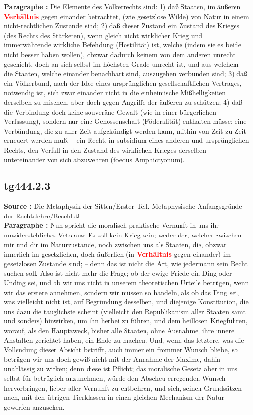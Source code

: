 \documentclass[a4paper,12pt,twoside]{book}
\newcommand{\match}[1]{\textcolor{red}{\textbf{#1}}}
\begin{document}
	\textbf{Paragraphe : }Die Elemente des Völkerrechts sind: 1) daß Staaten, im äußeren \match{Verhältnis} gegen einander betrachtet, (wie gesetzlose Wilde) von Natur in einem nicht-rechtlichen Zustande sind; 2) daß dieser Zustand ein Zustand des Krieges (des Rechts des Stärkeren), wenn gleich nicht wirklicher Krieg und immerwährende wirkliche Befehdung (Hostilität) ist, welche (indem sie es beide nicht besser haben wollen), obzwar dadurch keinem von dem anderen unrecht geschieht, doch an sich selbst im höchsten Grade unrecht ist, und aus welchem die Staaten, welche einander benachbart sind, auszugehen verbunden sind; 3) daß ein Völkerbund, nach der Idee eines ursprünglichen gesellschaftlichen Vertrages, notwendig ist, sich zwar einander nicht in die einheimische Mißhelligkeiten derselben zu mischen, aber doch gegen Angriffe der äußeren zu schützen; 4) daß die Verbindung doch keine souveräne Gewalt (wie in einer bürgerlichen Verfassung), sondern nur eine Genossenschaft (Föderalität) enthalten müsse; eine Verbündung, die zu aller Zeit aufgekündigt werden kann, mithin von Zeit zu Zeit erneuert werden muß, – ein Recht, in subsidium eines anderen und ursprünglichen Rechts, den Verfall in den Zustand des wirklichen Krieges derselben untereinander von sich abzuwehren (foedus Amphictyonum). 
	
	\subsection*{tg444.2.3} 
	\textbf{Source : }Die Metaphysik der Sitten/Erster Teil. Metaphysische Anfangsgründe der Rechtslehre/Beschluß\\  
	
	\textbf{Paragraphe : }Nun spricht die moralisch-praktische Vernunft in uns ihr unwiderstehliches Veto aus: Es soll kein Krieg sein; weder der, welcher zwischen mir und dir im Naturzustande, noch zwischen uns als Staaten, die, obzwar innerlich im gesetzlichen, doch äußerlich (in \match{Verhältnis} gegen einander) im gesetzlosen Zustande sind; – denn das ist nicht die Art, wie jedermann sein Recht suchen soll. Also ist nicht mehr die Frage; ob der ewige Friede ein Ding oder Unding sei, und ob wir uns nicht in unserem theoretischen Urteile betrügen, wenn wir das erstere annehmen, sondern wir müssen so handeln, als ob das Ding sei, was vielleicht nicht ist, auf Begründung desselben, und diejenige Konstitution, die uns dazu die tauglichste scheint (vielleicht den Republikanism aller Staaten samt und sonders) hinwirken, um ihn herbei zu führen, und dem heillosen Kriegführen, worauf, als den Hauptzweck, bisher alle Staaten, ohne Ausnahme, ihre innere Anstalten gerichtet haben, ein Ende zu machen. Und, wenn das letztere, was die Vollendung dieser Absicht betrifft, auch immer ein frommer Wunsch bliebe, so betrügen wir uns doch gewiß nicht mit der Annahme der Maxime, dahin unablässig zu wirken; denn diese ist Pflicht; das moralische Gesetz aber in uns selbst für betrüglich anzunehmen, würde den Abscheu erregenden Wunsch hervorbringen,  lieber aller Vernunft zu entbehren, und sich, seinen Grundsätzen nach, mit den übrigen Tierklassen in einen gleichen Mechanism der Natur geworfen anzusehen. 
	
\end{document}
